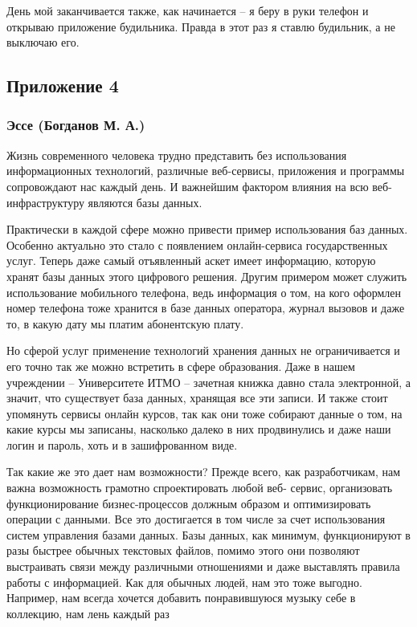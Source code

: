\documentclass[a4paper,14pt]{extarticle}
\begin{document}
День мой заканчивается также, как начинается – я беру в руки телефон и открываю приложение будильника. Правда в этот раз я ставлю будильник, а не выключаю его.

\newpage

\subsection*{\hfill Приложение 4}

\subsubsection*{\centering Эссе (Богданов М. А.)}

Жизнь современного человека трудно представить без использования информационных технологий, различные веб-сервисы, приложения и программы сопровождают нас каждый день. И важнейшим фактором влияния на всю веб-инфраструктуру являются базы данных.

Практически в каждой сфере можно привести пример использования баз данных. Особенно актуально это стало с появлением онлайн-сервиса государственных услуг. Теперь даже самый отъявленный аскет имеет информацию, которую хранят базы данных этого цифрового решения. Другим примером может служить использование мобильного телефона, ведь информация о том, на кого оформлен номер телефона тоже хранится в базе данных оператора, журнал вызовов и даже то, в какую дату мы платим абонентскую плату.

Но сферой услуг применение технологий хранения данных не ограничивается и его точно так же можно встретить в сфере образования. Даже в нашем учреждении – Университете ИТМО – зачетная книжка давно стала электронной, а значит, что существует база данных, хранящая все эти записи. И также стоит упомянуть сервисы онлайн курсов, так как они тоже собирают данные о том, на какие курсы мы записаны, насколько далеко в них продвинулись и даже наши логин и пароль, хоть и в зашифрованном виде.

Так какие же это дает нам возможности? Прежде всего, как разработчикам, нам важна возможность грамотно спроектировать любой веб- сервис, организовать функционирование бизнес-процессов должным образом и оптимизировать операции с данными. Все это достигается в том числе за счет использования систем управления базами данных. Базы данных, как минимум, функционируют в разы быстрее обычных текстовых файлов, помимо этого они позволяют выстраивать связи между различными отношениями и даже выставлять правила работы с информацией. Как для обычных людей, нам это тоже выгодно. Например, нам всегда хочется добавить понравившуюся музыку себе в коллекцию, нам лень каждый раз
\end{document}
